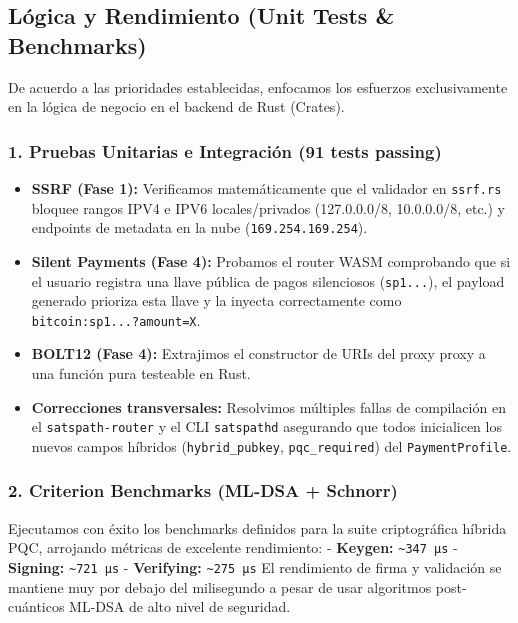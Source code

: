 \documentclass[
]{article}
\providecommand{\tightlist}{%
  \setlength{\itemsep}{0pt}\setlength{\parskip}{0pt}}
\begin{document}
\hypertarget{luxf3gica-y-rendimiento-unit-tests-benchmarks}{%
\subsection{Lógica y Rendimiento (Unit Tests \&
Benchmarks)}\label{luxf3gica-y-rendimiento-unit-tests-benchmarks}}

De acuerdo a las prioridades establecidas, enfocamos los esfuerzos
exclusivamente en la lógica de negocio en el backend de Rust (Crates).

\hypertarget{pruebas-unitarias-e-integraciuxf3n-91-tests-passing}{%
\subsubsection{1. Pruebas Unitarias e Integración (91 tests
passing)}\label{pruebas-unitarias-e-integraciuxf3n-91-tests-passing}}

\begin{itemize}
\tightlist
\item
  \textbf{SSRF (Fase 1):} Verificamos matemáticamente que el validador
  en \texttt{ssrf.rs} bloquee rangos IPV4 e IPV6 locales/privados
  (127.0.0.0/8, 10.0.0.0/8, etc.) y endpoints de metadata en la nube
  (\texttt{169.254.169.254}).
\item
  \textbf{Silent Payments (Fase 4):} Probamos el router WASM comprobando
  que si el usuario registra una llave pública de pagos silenciosos
  (\texttt{sp1...}), el payload generado prioriza esta llave y la
  inyecta correctamente como \texttt{bitcoin:sp1...?amount=X}.
\item
  \textbf{BOLT12 (Fase 4):} Extrajimos el constructor de URIs del proxy
  proxy a una función pura testeable en Rust.
\item
  \textbf{Correcciones transversales:} Resolvimos múltiples fallas de
  compilación en el \texttt{satspath-router} y el CLI \texttt{satspathd}
  asegurando que todos inicialicen los nuevos campos híbridos
  (\texttt{hybrid\_pubkey}, \texttt{pqc\_required}) del
  \texttt{PaymentProfile}.
\end{itemize}

\hypertarget{criterion-benchmarks-ml-dsa-schnorr}{%
\subsubsection{2. Criterion Benchmarks (ML-DSA +
Schnorr)}\label{criterion-benchmarks-ml-dsa-schnorr}}

Ejecutamos con éxito los benchmarks definidos para la suite
criptográfica híbrida PQC, arrojando métricas de excelente rendimiento:
- \textbf{Keygen:} \texttt{\textasciitilde{}347\ µs} - \textbf{Signing:}
\texttt{\textasciitilde{}721\ µs} - \textbf{Verifying:}
\texttt{\textasciitilde{}275\ µs} El rendimiento de firma y validación
se mantiene muy por debajo del milisegundo a pesar de usar algoritmos
post-cuánticos ML-DSA de alto nivel de seguridad.
\end{document}
